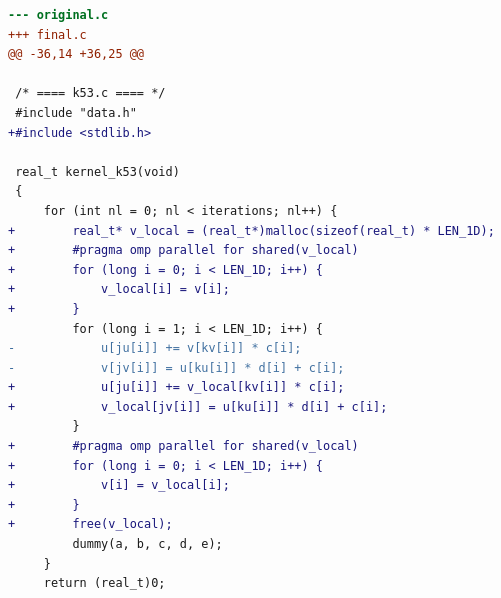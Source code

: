 \begin{lstlisting}[language=diff,basicstyle=\ttfamily\scriptsize,breaklines=true,caption={tsvc_c2/k53 — parallel-not-faster (e2v6b_fb_3)}]
--- original.c
+++ final.c
@@ -36,14 +36,25 @@
 
 /* ==== k53.c ==== */
 #include "data.h"
+#include <stdlib.h>
 
 real_t kernel_k53(void)
 {
     for (int nl = 0; nl < iterations; nl++) {
+        real_t* v_local = (real_t*)malloc(sizeof(real_t) * LEN_1D);
+        #pragma omp parallel for shared(v_local) 
+        for (long i = 0; i < LEN_1D; i++) {
+            v_local[i] = v[i];
+        }
         for (long i = 1; i < LEN_1D; i++) {
-            u[ju[i]] += v[kv[i]] * c[i];
-            v[jv[i]] = u[ku[i]] * d[i] + c[i];
+            u[ju[i]] += v_local[kv[i]] * c[i];
+            v_local[jv[i]] = u[ku[i]] * d[i] + c[i];
         }
+        #pragma omp parallel for shared(v_local) 
+        for (long i = 0; i < LEN_1D; i++) {
+            v[i] = v_local[i];
+        }
+        free(v_local);
         dummy(a, b, c, d, e);
     }
     return (real_t)0;
\end{lstlisting}
